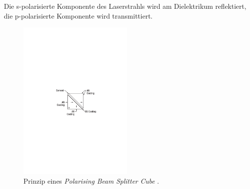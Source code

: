 Die s-polarisierte Komponente des Laserstrahls wird am Dielektrikum reflektiert, die p-polarisierte Komponente wird transmittiert.
\begin{figure}[h!]
  \centering
  \includegraphics[width=0.5\textwidth]{content/images/pbsc.pdf}
  \caption{Prinzip eines \textit{Polarising Beam Splitter Cube} \cite{thorlabs}.}
  \label{fig:pbsc}
\end{figure}





